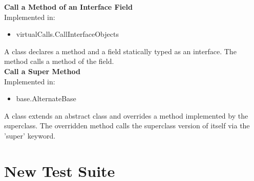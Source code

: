 \documentclass{article}
\begin{document}
\noindent
\textbf{Call a Method of an Interface Field}\\
Implemented in: 
\begin{itemize}
    \item virtualCalls.CallInterfaceObjects
\end{itemize}
A class declares a method and a field statically typed as an interface. The method calls a method of the field.\\

\noindent
\textbf{Call a Super Method}\\
Implemented in: 
\begin{itemize}
    \item base.AlternateBase
\end{itemize}
A class extends an abstract class and overrides a method implemented by the superclass. The overridden method calls the superclass version of itself via the 'super' keyword.\\

\section{New Test Suite}\label{sec:newtestsuite}
\end{document}
